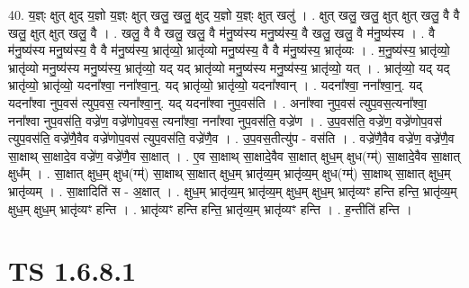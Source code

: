\documentclass[17pt]{extarticle}
\begin{document}
40. य॒ज्ञ्ः क्षुत् क्षुद् य॒ज्ञो य॒ज्ञ्ः क्षुत् खलु॒ खलु॒ क्षुद् य॒ज्ञो य॒ज्ञ्ः क्षुत् खलु॑ । . क्षुत् खलु॒ खलु॒ क्षुत् क्षुत् खलु॒ वै वै खलु॒ क्षुत् क्षुत् खलु॒ वै । . खलु॒ वै वै खलु॒ खलु॒ वै म॑नु॒ष्य॑स्य मनु॒ष्य॑स्य॒ वै खलु॒ खलु॒ वै म॑नु॒ष्य॑स्य । . वै म॑नु॒ष्य॑स्य मनु॒ष्य॑स्य॒ वै वै म॑नु॒ष्य॑स्य॒ भ्रातृ॑व्यो॒ भ्रातृ॑व्यो मनु॒ष्य॑स्य॒ वै वै म॑नु॒ष्य॑स्य॒ भ्रातृ॑व्यः । . म॒नु॒ष्य॑स्य॒ भ्रातृ॑व्यो॒ भ्रातृ॑व्यो मनु॒ष्य॑स्य मनु॒ष्य॑स्य॒ भ्रातृ॑व्यो॒ यद् यद् भ्रातृ॑व्यो मनु॒ष्य॑स्य मनु॒ष्य॑स्य॒ भ्रातृ॑व्यो॒ यत् । . भ्रातृ॑व्यो॒ यद् यद् भ्रातृ॑व्यो॒ भ्रातृ॑व्यो॒ यदना᳚श्वा॒ नना᳚श्वा॒न्॒. यद् भ्रातृ॑व्यो॒ भ्रातृ॑व्यो॒ यदना᳚श्वान् । . यदना᳚श्वा॒ नना᳚श्वा॒न्॒. यद् यदना᳚श्वा नुप॒वस॑ त्युप॒वस॒ त्यना᳚श्वा॒न्॒. यद् यदना᳚श्वा नुप॒वस॑ति । . अना᳚श्वा नुप॒वस॑ त्युप॒वस॒त्यना᳚श्वा॒ नना᳚श्वा नुप॒वस॑ति॒ वज्रे॑ण॒ वज्रे॑णोप॒वस॒ त्यना᳚श्वा॒ नना᳚श्वा नुप॒वस॑ति॒ वज्रे॑ण । . उ॒प॒वस॑ति॒ वज्रे॑ण॒ वज्रे॑णोप॒वस॑ त्युप॒वस॑ति॒ वज्रे॑णै॒वैव वज्रे॑णोप॒वस॑ त्युप॒वस॑ति॒ वज्रे॑णै॒व । . उ॒प॒वस॒तीत्यु॑प - वस॑ति । . वज्रे॑णै॒वैव वज्रे॑ण॒ वज्रे॑णै॒व सा॒क्षाथ् सा॒क्षादे॒व वज्रे॑ण॒ वज्रे॑णै॒व सा॒क्षात् । . ए॒व सा॒क्षाथ् सा॒क्षादे॒वैव सा॒क्षात् क्षुध॒म् क्षुध(ग्म्॑) सा॒क्षादे॒वैव सा॒क्षात् क्षुध᳚म् । . सा॒क्षात् क्षुध॒म् क्षुध(ग्म्॑) सा॒क्षाथ् सा॒क्षात् क्षुध॒म् भ्रातृ॑व्य॒म् भ्रातृ॑व्य॒म् क्षुध(ग्म्॑) सा॒क्षाथ् सा॒क्षात् क्षुध॒म् भ्रातृ॑व्यम् । . सा॒क्षादिति॑ स - अ॒क्षात् । . क्षुध॒म् भ्रातृ॑व्य॒म् भ्रातृ॑व्य॒म् क्षुध॒म् क्षुध॒म् भ्रातृ॑व्यꣳ हन्ति हन्ति॒ भ्रातृ॑व्य॒म् क्षुध॒म् क्षुध॒म् भ्रातृ॑व्यꣳ हन्ति । . भ्रातृ॑व्यꣳ हन्ति हन्ति॒ भ्रातृ॑व्य॒म् भ्रातृ॑व्यꣳ हन्ति । . ह॒न्तीति॑ हन्ति । \newline
\pagebreak
{}

\section{ TS 1.6.8.1 }
\end{document}
